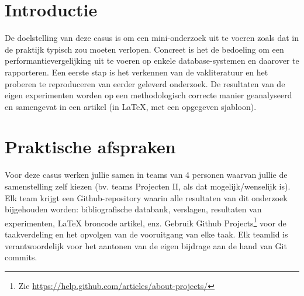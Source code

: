\documentclass[fleqn,10pt]{voorstel}
\affiliation{\textbf{Contact:}
  \textsuperscript{1} \href{mailto:jens.buysse@hogent.be}{jens.buysse@hogent.be};
  \textsuperscript{2} \href{mailto:anita.bernard@hogent.be}{anita.bernard@hogent.be};
  \textsuperscript{3} \href{mailto:bert.vanvreckem@hogent.be}{bert.vanvreckem@hogent.be}}
\begin{document}
\maketitle %
\tableofcontents %
\thispagestyle{empty} %



\section{Introductie} %
\label{sec:introductie}

De doelstelling van deze casus is om een mini-onderzoek uit te voeren zoals dat in de praktijk typisch zou moeten verlopen. Concreet is het de bedoeling om een performantievergelijking uit te voeren op enkele database-systemen en daarover te rapporteren. Een eerste stap is het verkennen van de vakliteratuur en het proberen te reproduceren van eerder geleverd onderzoek. De resultaten van de eigen experimenten worden op een methodologisch correcte manier geanalyseerd en samengevat in een artikel (in {\LaTeX}, met een opgegeven sjabloon).

\section{Praktische afspraken}

Voor deze casus werken jullie samen in teams van 4 personen waarvan jullie de samenstelling zelf kiezen (bv. teams Projecten II, als dat mogelijk/wenselijk is). Elk team krijgt een Github-repository waarin alle resultaten van dit onderzoek bijgehouden worden: bibliografische databank, verslagen, resultaten van experimenten, {\LaTeX} broncode artikel, enz. Gebruik Github Projects\footnote{Zie \url{https://help.github.com/articles/about-projects/}} voor de taakverdeling en het opvolgen van de vooruitgang van elke taak. Elk teamlid is verantwoordelijk voor het aantonen van de eigen bijdrage aan de hand van Git commits. 
\end{document}
